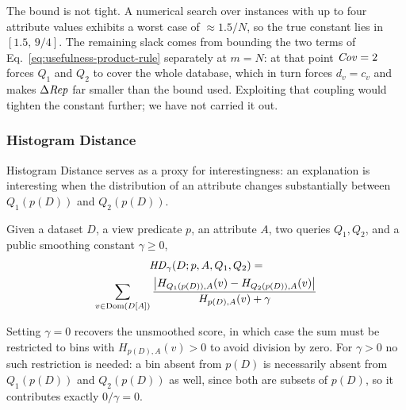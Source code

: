 \begin{remark}[Tightness]
\label{rem:usefulness-tightness}
The bound is not tight.
A numerical search over instances with up to four attribute values exhibits a worst case of $\approx 1.5/N$, so the true constant lies in $[1.5,\,9/4]$.
The remaining slack comes from bounding the two terms of Eq.~\eqref{eq:usefulness-product-rule} separately at $m=N$: at that point $\mathit{Cov}=2$ forces $Q_1$ and $Q_2$ to cover the whole database, which in turn forces $d_v=c_v$ and makes $\Delta\mathit{Rep}$ far smaller than the bound used.
Exploiting that coupling would tighten the constant further; we have not carried it out.
\end{remark}


\subsubsection{Histogram Distance}
\label{subsubsec:histogram-distance}

Histogram Distance serves as a proxy for interestingness: an explanation is interesting when the distribution of an attribute changes substantially between $Q_1(p(D))$ and $Q_2(p(D))$.

\begin{definition}
\label{def:hd}
Given a dataset $D$, a view predicate $p$, an attribute $A$, two queries $Q_1,Q_2$, and a public smoothing constant $\gamma \ge 0$,
\begin{multline}
\mathit{HD}_\gamma(D;p,A,Q_1,Q_2) = \\
\sum_{v\in \operatorname{Dom}(D[A])}
\frac{\big|H_{Q_1(p(D)),A}(v)-H_{Q_2(p(D)),A}(v)\big|}
     {H_{p(D),A}(v)+\gamma}
\label{eq:hd-definition}
\end{multline}
\end{definition}

Setting $\gamma=0$ recovers the unsmoothed score, in which case the sum must be restricted to bins with $H_{p(D),A}(v)>0$ to avoid division by zero.
For $\gamma>0$ no such restriction is needed: a bin absent from $p(D)$ is necessarily absent from $Q_1(p(D))$ and $Q_2(p(D))$ as well, since both are subsets of $p(D)$, so it contributes exactly $0/\gamma=0$.

